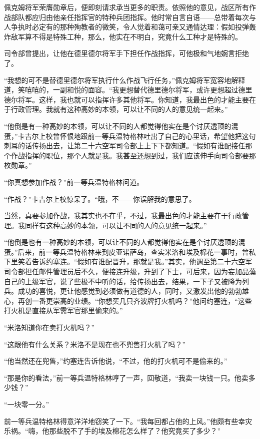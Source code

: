    佩克姆将军荣膺勋章后，便即刻请求承当更多的职责。依照他的意见，战区所有作战部队都应归由他亲任指挥官的特种兵团指挥。他时常自言自语——总带着每次与人争执时必定有的那种殉教者的微笑，令人觉着和蔼可亲又通情达理：假如投弹轰炸敌军算不得是特殊工种，那么，他实在不明白，究竟什么工种才是特殊的。

    司令部曾提出，让他在德里德尔将军手下担任作战指挥，可他极和气地婉言拒绝了。

    “我想的可不是替德里德尔将军执行什么作战飞行任务，”佩克姆将军宽容地解释道，笑嘻嘻的，一副和悦的面容。“我更想替代德里德尔将军，或许更想超过德里德尔将军。这样，我也就可以指挥许多其他将军。你知道，我最出色的才能主要在于行政管理。我就有这种高妙的本领，可以让不同的人的意见统一起来。”

    “他倒是有一种高妙的本领，可以让不同的人都觉得他实在是个讨厌透顶的混蛋，”卡吉尔上校曾怀恨地跟前一等兵温特格林吐出了自己的心里话，希望他把这句刺耳的话传扬出去，让第二十六空军司令部上上下下都知道。“假如有谁配接任那个作战指挥的职位，那个人就是我。我甚至还想到过，我们应该伸手向司令部要那枚勋章。”

    “你真想参加作战？”前一等兵温特格林问道。

    “作战？”卡吉尔上校惊呆了。“哦，不——你误解我的意思了。

    当然，真要参加作战，我其实也不在乎，不过，我最出色的才能主要在于行政管理。我同样有这种高妙的本领，可以让不同的人的意见统一起来。”

    “他倒是也有一种高妙的本领，可以让不同的人都觉得他实在是个讨厌透顶的混蛋。”后来，前一等兵温特格林来到皮亚诺萨岛，查实米洛和埃及棉花一事时，曾私下里笑着告诉约塞连。“假如有谁配晋升，那就是我。”其实，他调至第二十六空军司令部担任邮件管理员后不久，便接连升级，升到了下士，可后来，因为妄加品藻自己的上级军官，说了些极不中听的话，给传扬出去，结果，一下子又被降为列兵。成功的喜悦，更让他感觉到必须做有道德的人，同时，又激发出他的勃勃雄心，再创一番更崇高的业绩。“你想买几只齐波牌打火机吗？”他问约塞连，“这些打火机是直接从军需军官那里偷来的。”

    “米洛知道你在卖打火机吗？”

    “这跟他有什么关系？米洛不是现在也不兜售打火机了吗？”

    “他当然还在兜售，”约塞连告诉他说，“不过，他的打火机可不是偷来的。”

    “那是你的看法，”前一等兵温特格林哼了一声，回敬道，“我卖一块钱一只。他卖多少钱？”

    “一块零一分。”

    前一等兵温特格林得意洋洋地窃笑了一下。“我每回都占他的上风。”他颇有些幸灾乐祸。“嗨，他那些脱不了手的埃及棉花怎么样了？他究竟买了多少？”

